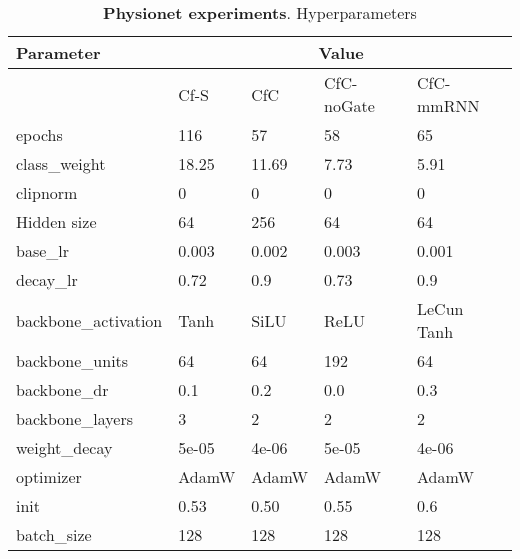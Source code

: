 \documentclass[12pt]{article}
\begin{document}
\begin{table}[t]
    \centering
    \caption{\textbf{Physionet experiments}. Hyperparameters}
\begin{tabular}{lllll}
\toprule
Parameter & \multicolumn{4}{c}{Value}  \\
\midrule
{} & Cf-S & CfC & CfC-noGate & CfC-mmRNN \\
\midrule
epochs & 116 & 57 & 58 & 65 \\ 
class\_weight & 18.25 & 11.69 & 7.73 & 5.91 \\ 
clipnorm & 0 & 0 & 0 & 0 \\ 
Hidden size & 64 & 256 & 64 & 64 \\
   base\_lr & 0.003 & 0.002 & 0.003 & 0.001\\
   decay\_lr & 0.72 & 0.9 & 0.73 & 0.9 \\ 
   backbone\_activation & Tanh & SiLU & ReLU & LeCun Tanh \\ 
   backbone\_units & 64 & 64 & 192 & 64 \\
   backbone\_dr & 0.1 & 0.2 & 0.0 & 0.3 \\
   backbone\_layers & 3 & 2 & 2 & 2 \\
   weight\_decay & 5e-05 & 4e-06 & 5e-05 & 4e-06 \\ 
   optimizer & AdamW & AdamW & AdamW & AdamW \\
   init & 0.53 & 0.50 & 0.55 & 0.6 \\
   batch\_size & 128 & 128 & 128 & 128\\
\bottomrule
\end{tabular}
    \label{tab:hyperparamsphysionet}
\end{table}
\end{document}
